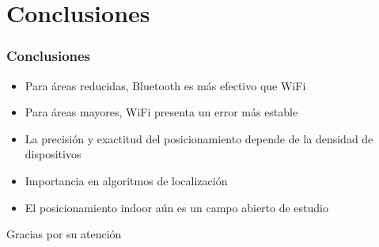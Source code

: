 \documentclass[mathserif]{beamer}
\begin{document}
\section{Conclusiones}

\begin{frame}
\frametitle{Conclusiones}

\begin{itemize}
\item Para áreas reducidas, Bluetooth es más efectivo que WiFi
\pause
\item Para áreas mayores, WiFi presenta un error más estable
\pause
\item La precisión y exactitud del posicionamiento depende de la densidad de dispositivos
\pause
\item Importancia en algoritmos de localización
\pause
\item El posicionamiento indoor aún es un campo abierto de estudio

\end{itemize}

\end{frame}


\begin{frame}
\Huge{\centerline{Gracias por su atención}}
\end{frame}

\end{document}
